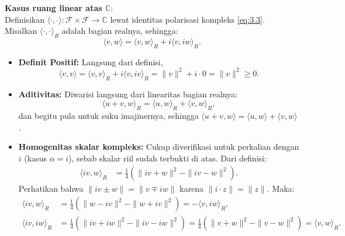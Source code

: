 \documentclass[aspectratio=169,11pt]{beamer}
\theoremstyle{definition}
\newcommand{\C}{\mathbb{C}}
\begin{document}
\begin{frame}[allowframebreaks]{\insertsection}{\insertsubsection}
  \textbf{Kasus ruang linear atas $\C$}: \\
  Definisikan $\langle \cdot, \cdot \rangle : \mathcal{F} \times \mathcal{F} \to \C$ lewat identitas polarisasi kompleks \eqref{eq:3.3}. Misalkan $\langle \cdot, \cdot \rangle_R$ adalah bagian realnya, sehingga:
  \begin{equation*}
    \langle v,w \rangle = \langle v,w \rangle_R + i\langle v,iw \rangle_R.
  \end{equation*}
  \begin{itemize}
    \item \textbf{Definit Positif:} Langsung dari definisi,
          \begin{equation*}
            \langle v,v \rangle = \langle v,v \rangle_R + i\langle v,iv \rangle_R = \|v\|^2 + i \cdot 0 = \|v\|^2 \geq 0.
          \end{equation*}

    \item \textbf{Aditivitas:} Diwarisi langsung dari linearitas bagian realnya:
          \begin{equation*}
            \langle u+v, w \rangle_R = \langle u,w \rangle_R + \langle v,w \rangle_R,
          \end{equation*}
          dan begitu pula untuk suku imajinernya, sehingga $\langle u+v, w \rangle = \langle u,w \rangle + \langle v,w \rangle$.

    \item \textbf{Homogenitas skalar kompleks:} Cukup diverifikasi untuk perkalian dengan $i$ (kasus $\alpha = i$), sebab skalar riil sudah terbukti di atas. Dari definisi:
          \begin{align*}
            \langle iv, w \rangle_R & = \frac{1}{4}\left(\|iv+w\|^2 - \|iv-w\|^2\right).
          \end{align*}
          Perhatikan bahwa $\|iv \pm w\| = \|v \mp iw\|$ karena $\|i \cdot z\| = \|z\|$. Maka:
          \begin{align*}
            \langle iv, w \rangle_R  & = \frac{1}{4}\left(\|w - iv\|^2 - \|w + iv\|^2\right) = -\langle v, iw \rangle_R,                                             \\
            \langle iv, iw \rangle_R & = \frac{1}{4}\left(\|iv+iw\|^2 - \|iv-iw\|^2\right) = \frac{1}{4}\left(\|v+w\|^2 - \|v-w\|^2\right) = \langle v, w \rangle_R.
          \end{align*}


\end{itemize}
\end{frame}
\end{document}
